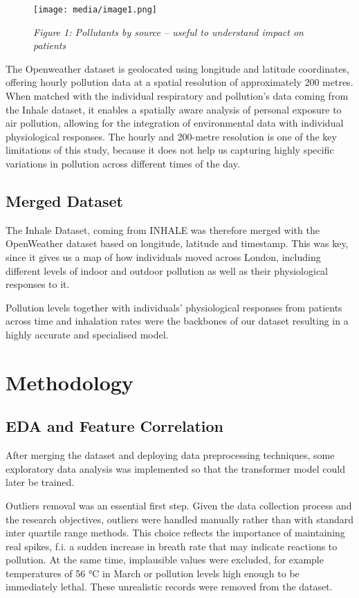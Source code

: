 \documentclass[12pt,a4paper]{report}
\begin{document}
\begin{figure}[h!]
    \centering
    \texttt{[image: media/image1.png]}
    \caption*{\emph{Figure 1: Pollutants by source -- useful to understand impact on patients}}
\end{figure}


The Openweather dataset is geolocated using longitude and latitude
coordinates, offering hourly pollution data at a spatial resolution of
approximately 200 metres. When matched with the individual respiratory
and pollution's data coming from the Inhale dataset, it enables a
spatially aware analysis of personal exposure to air pollution, allowing
for the integration of environmental data with individual physiological
responses. The hourly and 200-metre resolution is one of the key
limitations of this study, because it does not help us capturing highly
specific variations in pollution across different times of the day.

\section{Merged Dataset}
The Inhale Dataset, coming from INHALE was therefore merged with the
OpenWeather dataset based on longitude, latitude and timestamp. This was
key, since it gives us a map of how individuals moved across London,
including different levels of indoor and outdoor pollution as well as
their physiological responses to it.

Pollution levels together with individuals' physiological responses from
patients across time and inhalation rates were the backbones of our
dataset resulting in a highly accurate and specialised model.


\chapter{Methodology}
\section{EDA and Feature Correlation}

After merging the dataset and deploying data preprocessing techniques,
some exploratory data analysis was implemented so that the transformer
model could later be trained.

Outliers removal was an essential first step. Given the data collection
process and the research objectives, outliers were handled manually
rather than with standard inter quartile range methods. This choice
reflects the importance of maintaining real spikes, f.i. a sudden increase
in breath rate that may indicate reactions to pollution. At the same
time, implausible values were excluded, for example temperatures of 56
°C in March or pollution levels high enough to be immediately lethal.
These unrealistic records were removed from the dataset.
\end{document}
